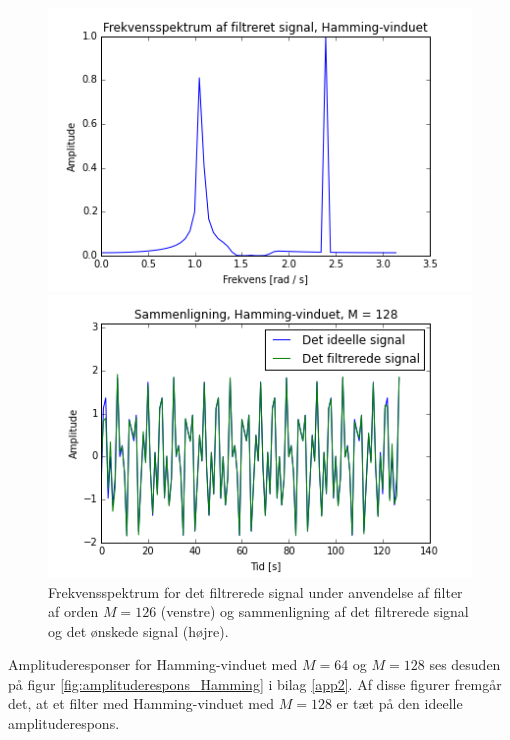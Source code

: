 \begin{figure}[H]
\begin{minipage}{0.49\textwidth}
\centering
\includegraphics[width=\textwidth]{figures/Filter/freq_filt_signal_Hamming.png}
\end{minipage}
\begin{minipage}{0.49\textwidth}
\centering
\includegraphics[width=\textwidth]{figures/Filter/signal_compare_Hamming.png}
\end{minipage}
\caption{Frekvensspektrum for det filtrerede signal under anvendelse af filter af orden $M=126$ (venstre) og sammenligning af det filtrerede signal og det ønskede signal (højre).}
\label{fig:resultat}
\end{figure}

Amplituderesponser for Hamming-vinduet med $M = 64$ og $M = 128$ ses desuden på figur \ref{fig:amplituderespons_Hamming} i bilag \ref{app2}. Af disse figurer fremgår det, at et filter med Hamming-vinduet med $M = 128$ er tæt på den ideelle amplituderespons.

